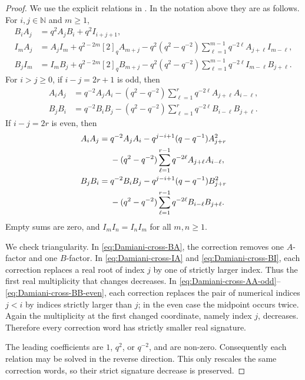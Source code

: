 \documentclass[11pt]{extarticle}
\theoremstyle{definition}
\theoremstyle{remark}
\numberwithin{equation}{section}
\newcommand{\N}{\mathbb N}
\begin{document}
\begin{proof}
We use the explicit relations in
\cite[Lemmas~3.1--3.3]{Terwilliger2019Catalan}.  In the notation above they
are as follows.  For $i,j\in\N$ and $m\geq1$,
\begin{align}
 B_iA_j&=q^2A_jB_i+q^2I_{i+j+1},
 \label{eq:Damiani-cross-BA}\\
 I_mA_j&=A_jI_m+q^{2-2m}[2]_qA_{m+j}
 -q^2(q^2-q^{-2})\sum_{\ell=1}^{m-1}
 q^{-2\ell}A_{j+\ell}I_{m-\ell},
 \label{eq:Damiani-cross-IA}\\
 B_jI_m&=I_mB_j+q^{2-2m}[2]_qB_{m+j}
 -q^2(q^2-q^{-2})\sum_{\ell=1}^{m-1}
 q^{-2\ell}I_{m-\ell}B_{j+\ell}.
 \label{eq:Damiani-cross-BI}
\end{align}
For $i>j\geq0$, if $i-j=2r+1$ is odd, then
\begin{align}
 A_iA_j&=q^{-2}A_jA_i
 -(q^2-q^{-2})\sum_{\ell=1}^{r}q^{-2\ell}
 A_{j+\ell}A_{i-\ell},
 \label{eq:Damiani-cross-AA-odd}\\
 B_jB_i&=q^{-2}B_iB_j
 -(q^2-q^{-2})\sum_{\ell=1}^{r}q^{-2\ell}
 B_{i-\ell}B_{j+\ell}.
 \label{eq:Damiani-cross-BB-odd}
\end{align}
If $i-j=2r$ is even, then
\begin{align}
 A_iA_j={}&q^{-2}A_jA_i
 -q^{j-i+1}(q-q^{-1})A_{j+r}^{2}
 \notag\\
 &-(q^2-q^{-2})\sum_{\ell=1}^{r-1}q^{-2\ell}
 A_{j+\ell}A_{i-\ell},
 \label{eq:Damiani-cross-AA-even}\\
 B_jB_i={}&q^{-2}B_iB_j
 -q^{j-i+1}(q-q^{-1})B_{j+r}^{2}
 \notag\\
 &-(q^2-q^{-2})\sum_{\ell=1}^{r-1}q^{-2\ell}
 B_{i-\ell}B_{j+\ell}.
 \label{eq:Damiani-cross-BB-even}
\end{align}
Empty sums are zero, and $I_mI_n=I_nI_m$ for all $m,n\geq1$.

We check triangularity.  In \eqref{eq:Damiani-cross-BA}, the correction
removes one $A$-factor and one $B$-factor.  In
\eqref{eq:Damiani-cross-IA} and \eqref{eq:Damiani-cross-BI}, each
correction replaces a real root of index $j$ by one of strictly larger
index.  Thus the first real multiplicity that changes decreases.  In
\eqref{eq:Damiani-cross-AA-odd}--\eqref{eq:Damiani-cross-BB-even}, each
correction replaces the pair of numerical indices $j<i$ by indices
strictly larger than $j$; in the even case the midpoint occurs twice.
Again the multiplicity at the first changed coordinate, namely index $j$,
decreases.  Therefore every correction word has strictly smaller real
signature.

The leading coefficients are $1$, $q^2$, or $q^{-2}$, and are non-zero.
Consequently each relation may be solved in the reverse direction.  This
only rescales the same correction words, so their strict signature decrease
is preserved.
\end{proof}
\end{document}
